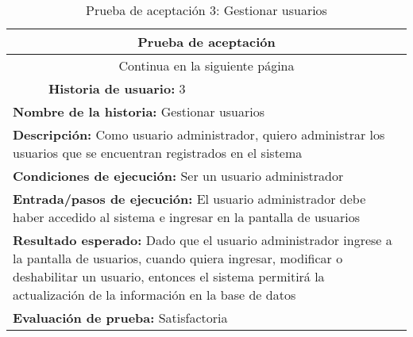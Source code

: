\begin{longtable}{|p{6.7cm}|p{6.7cm}|}
    \caption{Prueba de aceptación 3: Gestionar usuarios} \label{tab:prueba-3}
    \\
    \hline
    \multicolumn{2}{|c|}{\textbf{Prueba de aceptación}}                                                                                                              \\
    \hline

    \endfirsthead

    \hline
    \endhead

    \hline
    \multicolumn{2}{|c|}{{Continua en la siguiente página}}                                                                                                          \\
    \hline
    \endfoot

    \hline
    \endlastfoot
    \multicolumn{1}{|p{6.7cm}|}{\textbf{Número} 3 } & \multicolumn{1}{|p{6.7cm}|}{\textbf{Historia de usuario:} 3}                                                   \\
    \hline
    \multicolumn{2}{|p{13.4cm}|}{\textbf{Nombre de la historia:} Gestionar usuarios }                                                                                \\
    \hline
    \multicolumn{2}{|p{13.4cm}|}{\textbf{Descripción:} Como usuario administrador, quiero administrar los usuarios que se encuentran registrados en el sistema}      \\
    \hline
    \multicolumn{2}{|p{13.4cm}|}{\textbf{Condiciones de ejecución:} Ser un usuario administrador}                                                                    \\
    \hline
    \multicolumn{2}{|p{13.4cm}|}{\textbf{Entrada/pasos de ejecución:} El usuario administrador debe haber accedido al sistema e ingresar en la pantalla de usuarios} \\
    \hline
    \multicolumn{2}{|p{13.4cm}|}{\textbf{Resultado esperado:} Dado que el usuario administrador ingrese a la pantalla de usuarios, cuando quiera ingresar,
    modificar o deshabilitar un usuario, entonces el sistema permitirá la actualización de la información en la base de datos}                                       \\
    \hline
    \multicolumn{2}{|p{13.4cm}|}{\textbf{Evaluación de prueba:} Satisfactoria}                                                                                       \\
    \hline
\end{longtable}


